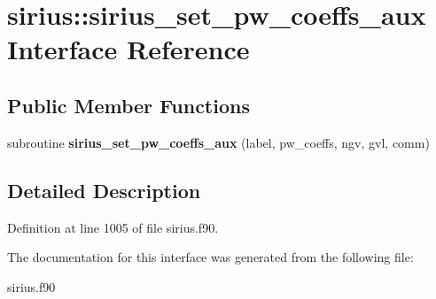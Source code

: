 \hypertarget{interfacesirius_1_1sirius__set__pw__coeffs__aux}{}\section{sirius\+:\+:sirius\+\_\+set\+\_\+pw\+\_\+coeffs\+\_\+aux Interface Reference}
\label{interfacesirius_1_1sirius__set__pw__coeffs__aux}
\subsection*{Public Member Functions}
\begin{DoxyCompactItemize}
\item 
\hypertarget{interfacesirius_1_1sirius__set__pw__coeffs__aux_aa55421db706bdf23047a6678f26b51e7}{}subroutine {\bfseries sirius\+\_\+set\+\_\+pw\+\_\+coeffs\+\_\+aux} (label, pw\+\_\+coeffs, ngv, gvl, comm)\label{interfacesirius_1_1sirius__set__pw__coeffs__aux_aa55421db706bdf23047a6678f26b51e7}

\end{DoxyCompactItemize}


\subsection{Detailed Description}


Definition at line 1005 of file sirius.\+f90.



The documentation for this interface was generated from the following file\+:\begin{DoxyCompactItemize}
\item 
sirius.\+f90\end{DoxyCompactItemize}
